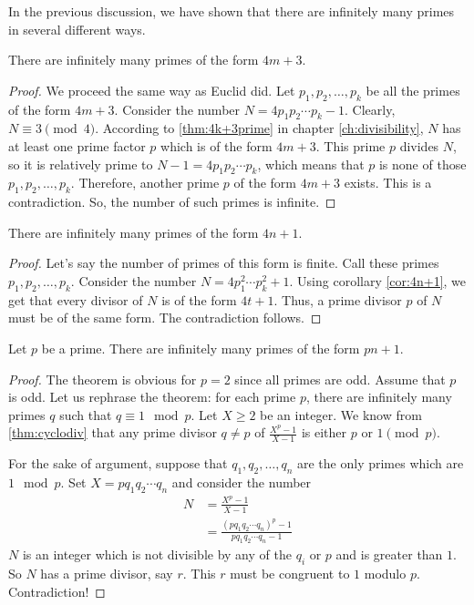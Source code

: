 \documentclass{subfiles}
\begin{document}
	In the previous discussion, we have shown that there are infinitely many primes in several different ways.
		\begin{theorem}
			There are infinitely many primes of the form $4m+3$.
		\end{theorem}

		\begin{proof}
			We proceed the same way as Euclid did. Let $p_1,p_2,\ldots,p_k$ be all the primes of the form $4m+3$. Consider the number $N=4p_1p_2\cdots p_k-1$. Clearly, $N\equiv3\pmod4$. According to \autoref{thm:4k+3prime} in chapter \eqref{ch:divisibility}, $N$ has at least one prime factor $p$ which is of the form $4m+3$. This prime $p$ divides $N$, so it is relatively prime to $N-1=4p_1p_2\cdots p_k$, which means that $p$ is none of those $p_1,p_2,\ldots,p_k$. Therefore, another prime $p$ of the form $4m+3$ exists. This is a contradiction. So, the number of such primes is infinite.
		\end{proof}

		\begin{theorem}
			There are infinitely many primes of the form $4n+1$.
		\end{theorem}

		\begin{proof}
			Let's say the number of primes of this form is finite. Call these primes $p_1,p_2,\ldots,p_k$. Consider the number $N=4p_1^2\cdots p_k^2+1$. Using corollary \eqref{cor:4n+1}, we get that every divisor of $N$ is of the form $4t+1$. Thus, a prime divisor $p$ of $N$ must be of the same form. The contradiction follows.
		\end{proof}

		\begin{theorem}
			Let $p$ be a prime. There are infinitely many primes of the form $pn+1$.
		\end{theorem}

		\begin{proof}
			The theorem is obvious for $p=2$ since all primes are odd. Assume that $p$ is odd. Let us rephrase the theorem: for each prime $p$, there are infinitely many primes $q$ such that $q\equiv1\mod{p}$. Let $X \geq 2$ be an integer. We know from \autoref{thm:cyclodiv} that any prime divisor $q \neq p$ of $\frac{X^{p}-1}{X-1}$ is either $p$ or $1 \pmod p$.

			For the sake of argument, suppose that $q_{1},q_{2},\ldots,q_{n}$ are the only primes which are $1\mod{p}$. Set $X=pq_{1}q_{2}\cdots q_{n}$ and consider the number
				\begin{align*}
					N & =\frac{X^{p}-1}{X-1}\\
					  & = \frac{(pq_1q_2\cdots q_n)^p-1}{pq_1q_2\cdots q_n-1}
				\end{align*}
			$N$ is an integer which is not divisible by any of the $q_{i}$ or $p$ and is greater than $1$. So $N$ has a prime divisor, say $r$. This $r$ must be congruent to $1$ modulo $p$. Contradiction!
		\end{proof}
\end{document}
